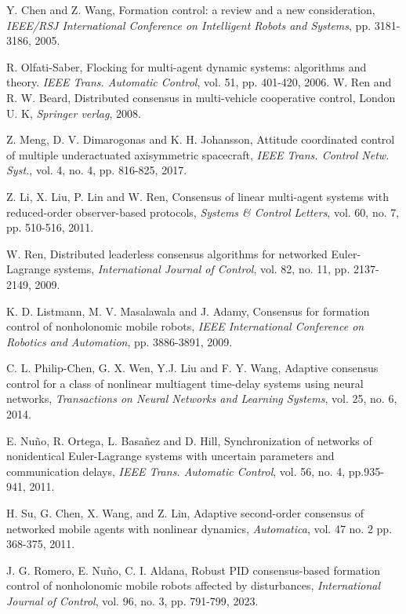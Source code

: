 \documentclass[journal,twoside]{IEEEtran}
\def\TAC{{\it IEEE Trans. Automat. Contr.}}
\def\AUT{{\it Automatica}}
\def\SCL{{\it Systems and Control Letters}}
\def\TAC{{\it IEEE Trans. Automatic Control}}
\def\IJC{{\it International Journal of Control}}
\def\SCL{{\it Systems \& Control Letters}}
\def\AUT{{\it Automatica}}
\begin{document}
\begin{thebibliography}{00}
Y. Chen and Z. Wang, Formation control: a  review and a new consideration,  {\it  IEEE/RSJ International Conference on Intelligent Robots and Systems}, pp. 3181-3186, 2005.

R. Olfati-Saber, Flocking for multi-agent dynamic systems: algorithms and theory. \TAC, vol. 51, pp. 401-420, 2006.
W. Ren and R. W. Beard, Distributed consensus in multi-vehicle cooperative control, London U. K, {\it Springer verlag}, 2008.

Z. Meng, D. V. Dimarogonas and K. H. Johansson, Attitude coordinated control of multiple underactuated axisymmetric spacecraft, {\it  IEEE Trans. Control Netw. Syst.}, vol. 4, no. 4, pp. 816-825, 2017.

Z. Li, X. Liu, P. Lin and W. Ren, Consensus of linear multi-agent systems with reduced-order observer-based protocols, \SCL, vol. 60, no. 7, pp. 510-516, 2011.


W. Ren, Distributed leaderless consensus algorithms for networked Euler-Lagrange systems, \IJC, vol. 82, no. 11, pp. 2137-2149, 2009.


K. D. Listmann, M. V. Masalawala and J. Adamy, Consensus for formation control of nonholonomic mobile robots, {\it IEEE International Conference on Robotics and Automation}, pp. 3886-3891, 2009.
 
 
C. L. Philip-Chen, G. X. Wen, Y.J. Liu and F. Y. Wang, Adaptive consensus control for a class of nonlinear multiagent time-delay systems using neural networks, {\it Transactions on Neural Networks and Learning Systems}, vol. 25, no. 6, 2014.

E. Nu\~no, R. Ortega, L. Basa\~nez and D. Hill, Synchronization of networks of nonidentical Euler-Lagrange systems with uncertain parameters and communication delays, \TAC, vol. 56, no. 4, pp.935-941, 2011. 

H. Su, G. Chen, X. Wang, and Z. Lin,  Adaptive second-order consensus of networked mobile agents with
nonlinear dynamics, \AUT,  vol. 47 no. 2 pp. 368-375, 2011.

J. G. Romero, E. Nu\~no, C. I. Aldana, Robust PID consensus-based formation control of nonholonomic mobile robots affected by disturbances, \IJC, vol. 96, no. 3, pp. 791-799, 2023. 


\end{thebibliography}
\end{document}
